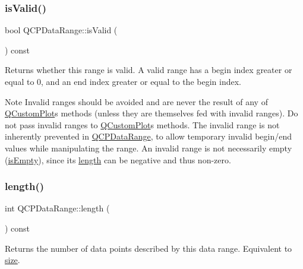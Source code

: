 \subsubsection{\texorpdfstring{is\+Valid()}{isValid()}}
{\footnotesize\ttfamily bool Q\+C\+P\+Data\+Range\+::is\+Valid (\begin{DoxyParamCaption}{ }\end{DoxyParamCaption}) const\hspace{0.3cm}{\ttfamily [inline]}}

Returns whether this range is valid. A valid range has a begin index greater or equal to 0, and an end index greater or equal to the begin index.

\begin{DoxyNote}{Note}
Invalid ranges should be avoided and are never the result of any of \hyperlink{classQCustomPlot}{Q\+Custom\+Plot}\textquotesingle{}s methods (unless they are themselves fed with invalid ranges). Do not pass invalid ranges to \hyperlink{classQCustomPlot}{Q\+Custom\+Plot}\textquotesingle{}s methods. The invalid range is not inherently prevented in \hyperlink{classQCPDataRange}{Q\+C\+P\+Data\+Range}, to allow temporary invalid begin/end values while manipulating the range. An invalid range is not necessarily empty (\hyperlink{classQCPDataRange_ac32e53fc05d6cd2eac96b96a7265d3b8}{is\+Empty}), since its \hyperlink{classQCPDataRange_a1e7836058f755c6ab9f11996477b7150}{length} can be negative and thus non-\/zero. 
\end{DoxyNote}
\mbox{\label{classQCPDataRange_a1e7836058f755c6ab9f11996477b7150}} 
\subsubsection{\texorpdfstring{length()}{length()}}
{\footnotesize\ttfamily int Q\+C\+P\+Data\+Range\+::length (\begin{DoxyParamCaption}{ }\end{DoxyParamCaption}) const\hspace{0.3cm}{\ttfamily [inline]}}

Returns the number of data points described by this data range. Equivalent to \hyperlink{classQCPDataRange_ac6af055e509d1b691c244954ff1c5887}{size}. \mbox{\label{classQCPDataRange_a54ff59048e01e46ac4aefafc844626c6}} 
